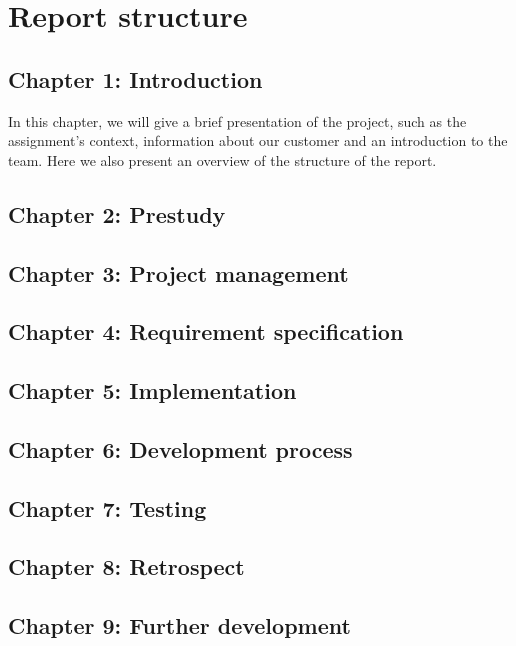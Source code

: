 \section{Report structure}
\subsection*{Chapter 1: Introduction}
In this chapter, we will give a brief presentation of the project, such as the assignment's context, information about our customer and an introduction to the team. Here we also present an overview of the structure of the report.

\subsection*{Chapter 2: Prestudy}
\subsection*{Chapter 3: Project management}
\subsection*{Chapter 4: Requirement specification}
\subsection*{Chapter 5: Implementation}
\subsection*{Chapter 6: Development process}
\subsection*{Chapter 7: Testing}
\subsection*{Chapter 8: Retrospect}
\subsection*{Chapter 9: Further development}